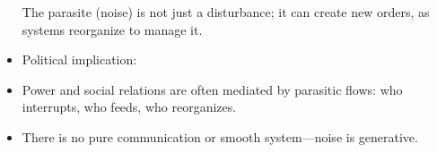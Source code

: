 \begin{itemize}

	The parasite (noise) is not just a disturbance; it can create new orders, as systems reorganize to manage it.
	\item Political implication:
	\item Power and social relations are often mediated by parasitic flows: who interrupts, who feeds, who reorganizes.
	\item There is no pure communication or smooth system—noise is generative.

\end{itemize}
